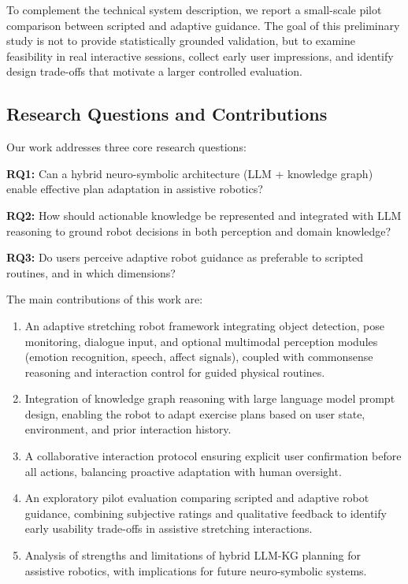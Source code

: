\documentclass[pdflatex,sn-basic,Numbered,iicol,twocolumn]{sn-jnl}%
\begin{document}
To complement the technical system description, we report a small-scale pilot comparison between scripted and adaptive guidance. The goal of this preliminary study is not to provide statistically grounded validation, but to examine feasibility in real interactive sessions, collect early user impressions, and identify design trade-offs that motivate a larger controlled evaluation.

\subsection{Research Questions and Contributions}

Our work addresses three core research questions:

\textbf{RQ1:} Can a hybrid neuro-symbolic architecture (LLM + knowledge graph) enable effective plan adaptation in assistive robotics?

\textbf{RQ2:} How should actionable knowledge be represented and integrated with LLM reasoning to ground robot decisions in both perception and domain knowledge?

\textbf{RQ3:} Do users perceive adaptive robot guidance as preferable to scripted routines, and in which dimensions?

The main contributions of this work are:

\begin{enumerate}
\item An adaptive stretching robot framework integrating object detection, pose monitoring, dialogue input, and optional multimodal perception modules (emotion recognition, speech, affect signals), coupled with commonsense reasoning and interaction control for guided physical routines.

\item Integration of knowledge graph reasoning with large language model prompt design, enabling the robot to adapt exercise plans based on user state, environment, and prior interaction history.

\item A collaborative interaction protocol ensuring explicit user confirmation before all actions, balancing proactive adaptation with human oversight.

\item An exploratory pilot evaluation comparing scripted and adaptive robot guidance, combining subjective ratings and qualitative feedback to identify early usability trade-offs in assistive stretching interactions.

\item Analysis of strengths and limitations of hybrid LLM-KG planning for assistive robotics, with implications for future neuro-symbolic systems.
\end{enumerate}
\end{document}
